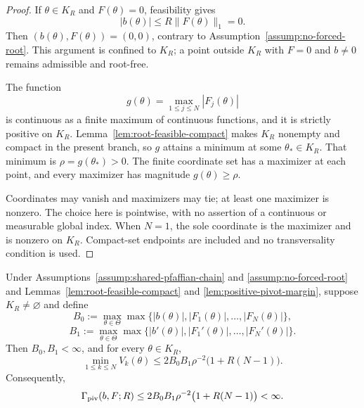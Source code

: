 \begin{proof}
If $\theta\in K_R$ and $F(\theta)=0$, feasibility gives
\[
|b(\theta)|\leq R\|F(\theta)\|_1=0.
\]
Then $(b(\theta),F(\theta))=(0,0)$, contrary to
Assumption~\ref{assump:no-forced-root}.  This argument is confined to
$K_R$; a point outside $K_R$ with $F=0$ and $b\neq0$ remains admissible and
root-free.

The function
\[
g(\theta)=\max_{1\leq j\leq N}|F_j(\theta)|
\]
is continuous as a finite maximum of continuous functions, and it is
strictly positive on $K_R$.  Lemma~\ref{lem:root-feasible-compact} makes
$K_R$ nonempty and compact in the present branch, so $g$ attains a minimum
at some $\theta_*\in K_R$.  That minimum is
$\rho=g(\theta_*)>0$.  The finite coordinate set has a maximizer at each
point, and every maximizer has magnitude $g(\theta)\geq\rho$.

Coordinates may vanish and maximizers may tie; at least one maximizer is
nonzero.  The choice here is pointwise, with no assertion of a continuous
or measurable global index.  When $N=1$, the sole coordinate is the
maximizer and is nonzero on $K_R$.  Compact-set endpoints are included and
no transversality condition is used.
\end{proof}

\begin{proposition}
\label{prop:fixed-family-pivot-bound}
Under Assumptions~\ref{assump:shared-pfaffian-chain} and
\ref{assump:no-forced-root} and Lemmas~\ref{lem:root-feasible-compact} and
\ref{lem:positive-pivot-margin}, suppose $K_R\neq\varnothing$ and define
\[
B_0:=\max_{\theta\in\Theta}
\max\{|b(\theta)|,|F_1(\theta)|,\ldots,|F_N(\theta)|\},
\]
\[
B_1:=\max_{\theta\in\Theta}
\max\{|b'(\theta)|,|F_1'(\theta)|,\ldots,|F_N'(\theta)|\}.
\]
Then $B_0,B_1<\infty$, and for every $\theta\in K_R$,
\[
\min_{1\leq k\leq N}V_k(\theta)
\leq2B_0B_1\rho^{-2}\bigl(1+R(N-1)\bigr).
\]
Consequently,
\[
\Gamma_{\rm piv}(b,F;R)
\leq2B_0B_1\rho^{-2}\bigl(1+R(N-1)\bigr)<\infty.
\]
\end{proposition}

